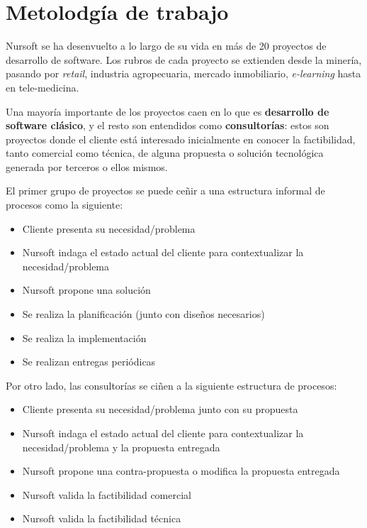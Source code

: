 \section{Metolodgía de trabajo}

Nursoft se ha desenvuelto a lo largo de su vida en más de 20 proyectos de desarrollo de software. 
Los rubros de cada proyecto se extienden desde la minería, pasando por \textit{retail}, industria agropecuaria, 
mercado inmobiliario, \textit{e-learning} hasta en tele-medicina. 

Una mayoría importante de los proyectos caen en lo que es
\textbf{desarrollo de software clásico}, y el resto son entendidos como \textbf{consultorías}:
estos son proyectos donde el cliente está interesado inicialmente en conocer la factibilidad,
tanto comercial como técnica, de alguna propuesta o solución tecnológica generada por terceros o ellos mismos.

El primer grupo de proyectos se puede ceñir a una estructura informal de procesos como la siguiente:

\begin{itemize}
  \item Cliente presenta su necesidad/problema
  \item Nursoft indaga el estado actual del cliente para contextualizar la necesidad/problema
  \item Nursoft propone una solución
  \item Se realiza la planificación (junto con diseños necesarios)
  \item Se realiza la implementación
  \item Se realizan entregas periódicas
\end{itemize}

Por otro lado, las consultorías se ciñen a la siguiente estructura de procesos:

\begin{itemize}
  \item Cliente presenta su necesidad/problema junto con su propuesta
  \item Nursoft indaga el estado actual del cliente para contextualizar la necesidad/problema y la propuesta entregada
  \item Nursoft propone una contra-propuesta o modifica la propuesta entregada
  \item Nursoft valida la factibilidad comercial
  \item Nursoft valida la factibilidad técnica
\end{itemize}

